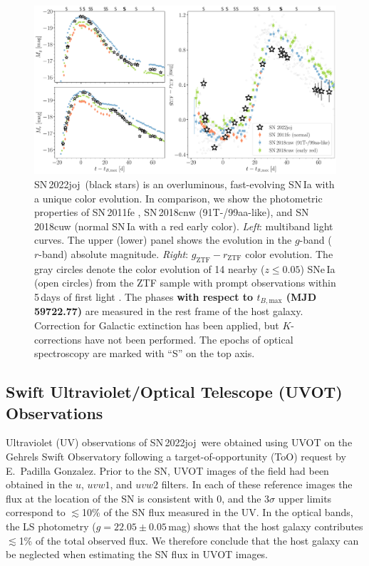 \documentclass[twocolumn]{aastex631}
\newcommand{\sn}{SN\,2022joj}
\newcommand{\rev}[1]{\textbf{#1}}
\begin{document}
\begin{CJK*}{UTF8}{gbsn}
\begin{figure}
    \centering
    \includegraphics[width=\textwidth]{photometry.pdf}
    \caption{\sn\ (black stars) is an overluminous, fast-evolving SN\,Ia with a unique color evolution. In comparison, we show the photometric properties of SN\,2011fe \citep[normal SN\,Ia;][]{Pereira_2013}, SN\,2018cnw (91T-/99aa-like), and SN\,2018cuw (normal SN\,Ia with a red early color). \textit{Left}: multiband light curves. The upper (lower) panel shows the evolution in the $g$-band ($r$-band) absolute magnitude.
    \textit{Right}: $g_\mathrm{ZTF}-r_\mathrm{ZTF}$ color evolution. 
    The gray circles denote the color evolution of 14 nearby ($z\le0.05$) SNe\,Ia (open circles) from the ZTF sample with prompt observations within 5\,days of first light \citep{Bulla2020}. The phases \rev{with respect to $t_{B, \mathrm{max}}$ (MJD 59722.77)} are measured in the rest frame of the host galaxy. Correction for Galactic extinction has been applied, but $K$-corrections have not been performed. The epochs of optical spectroscopy are marked with ``S'' on the top axis.}
    \label{fig:lc}
\end{figure}

\subsection{Swift Ultraviolet/Optical Telescope (UVOT) Observations}
Ultraviolet (UV) observations of \sn\ were obtained using UVOT \citep{UVOT_2005} on the Gehrels Swift Observatory \citep[Swift;][]{Swift_2004} following a target-of-opportunity (ToO) request by E.~Padilla Gonzalez. Prior to the SN, UVOT images of the field had been obtained in the $u$, $uvw1$, and $uvw2$ filters. In each of these reference images the flux at the location of the SN is consistent with 0, and the 3$\sigma$ upper limits correspond to $\lesssim$10\% of the SN flux measured in the UV. In the optical bands, the LS photometry ($g = 22.05\pm0.05$\,mag) shows that the host galaxy contributes $\lesssim$1\% of the total observed flux. We therefore conclude that the host galaxy can be neglected when estimating the SN flux in UVOT images.


\end{CJK*}
\end{document}
